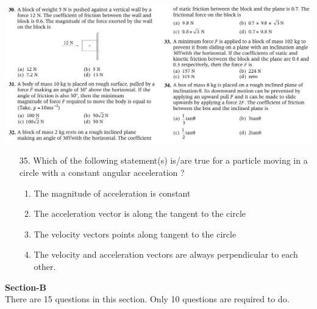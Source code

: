 \documentclass{article}
\begin{document}
\linebreak
\includegraphics[trim={0 0 0 0},clip, width=170 mm]{30-34.png}
\linebreak
\begin{enumerate}



\item[35.] Which of the following statement(s) is/are true for a particle moving in a circle with a constant angular acceleration ?
\begin{enumerate}
\item The magnitude of acceleration is constant
\item The acceleration vector is along the tangent to the circle
\item The velocity vectors points along tangent to the circle
\item The velocity and acceleration vectors are always perpendicular to each other.
\end{enumerate}

\end{enumerate}

\vspace*{5mm}

\begin{center}
\textbf{Section-B}\\
There are 15 questions in this section. Only 10 questions are required to do.\\
\end{center}
\end{document}
